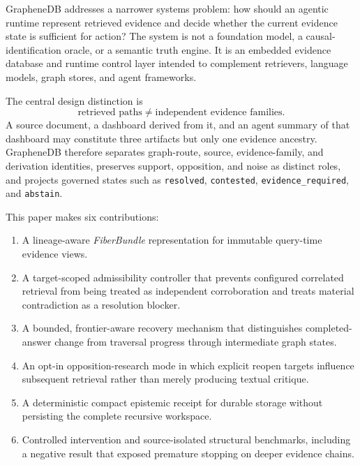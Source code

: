 \documentclass[10pt]{article}
\newcommand{\code}[1]{\texttt{#1}}
\begin{document}
GrapheneDB addresses a narrower systems problem: how should an agentic runtime represent retrieved evidence and decide whether the current evidence state is sufficient for action? The system is not a foundation model, a causal-identification oracle, or a semantic truth engine. It is an embedded evidence database and runtime control layer intended to complement retrievers, language models, graph stores, and agent frameworks.

The central design distinction is
\[
\text{retrieved paths} \neq \text{independent evidence families}.
\]
A source document, a dashboard derived from it, and an agent summary of that dashboard may constitute three artifacts but only one evidence ancestry. GrapheneDB therefore separates graph-route, source, evidence-family, and derivation identities, preserves support, opposition, and noise as distinct roles, and projects governed states such as \code{resolved}, \code{contested}, \code{evidence\_required}, and \code{abstain}.

This paper makes six contributions:
\begin{enumerate}[leftmargin=*]
  \item A lineage-aware \emph{FiberBundle} representation for immutable query-time evidence views.
  \item A target-scoped admissibility controller that prevents configured correlated retrieval from being treated as independent corroboration and treats material contradiction as a resolution blocker.
  \item A bounded, frontier-aware recovery mechanism that distinguishes completed-answer change from traversal progress through intermediate graph states.
  \item An opt-in opposition-research mode in which explicit reopen targets influence subsequent retrieval rather than merely producing textual critique.
  \item A deterministic compact epistemic receipt for durable storage without persisting the complete recursive workspace.
  \item Controlled intervention and source-isolated structural benchmarks, including a negative result that exposed premature stopping on deeper evidence chains.
\end{enumerate}
\end{document}
